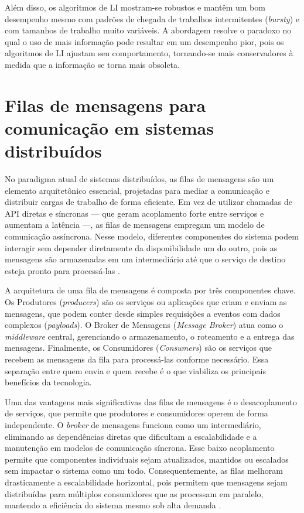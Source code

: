 Além disso, os algoritmos de LI mostram-se robustos e mantêm um bom desempenho mesmo com padrões de chegada de trabalhos intermitentes (\textit{bursty}) e com tamanhos de trabalho muito variáveis. A abordagem resolve o paradoxo no qual o uso de mais informação pode resultar em um desempenho pior, pois os algoritmos de LI ajustam seu comportamento, tornando-se mais conservadores à medida que a informação se torna mais obsoleta.

\section{Filas de mensagens para comunicação em sistemas distribuídos}

No paradigma atual de sistemas distribuídos, as filas de mensagens são um elemento arquitetônico essencial, projetadas para mediar a comunicação e distribuir cargas de trabalho de forma eficiente. Em vez de utilizar chamadas de API diretas e síncronas — que geram acoplamento forte entre serviços e aumentam a latência —, as filas de mensagens empregam um modelo de comunicação assíncrona. Nesse modelo, diferentes componentes do sistema podem interagir sem depender diretamente da disponibilidade um do outro, pois as mensagens são armazenadas em um intermediário até que o serviço de destino esteja pronto para processá-las \cite{messageQueueingThallapally2025}.

A arquitetura de uma fila de mensagens é composta por três componentes chave. Os Produtores (\textit{producers}) são os serviços ou aplicações que criam e enviam as mensagens, que podem conter desde simples requisições a eventos com dados complexos (\textit{payloads}). O Broker de Mensagens (\textit{Message Broker}) atua como o \textit{middleware} central, gerenciando o armazenamento, o roteamento e a entrega das mensagens. Finalmente, os Consumidores (\textit{Consumers}) são os serviços que recebem as mensagens da fila para processá-las conforme necessário. Essa separação entre quem envia e quem recebe é o que viabiliza os principais benefícios da tecnologia.

Uma das vantagens mais significativas das filas de mensagens é o desacoplamento de serviços, que permite que produtores e consumidores operem de forma independente. O \textit{broker} de mensagens funciona como um intermediário, eliminando as dependências diretas que dificultam a escalabilidade e a manutenção em modelos de comunicação síncrona. Esse baixo acoplamento permite que componentes individuais sejam atualizados, mantidos ou escalados sem impactar o sistema como um todo. Consequentemente, as filas melhoram drasticamente a escalabilidade horizontal, pois permitem que mensagens sejam distribuídas para múltiplos consumidores que as processam em paralelo, mantendo a eficiência do sistema mesmo sob alta demanda \cite{messageQueueingThallapally2025}.

